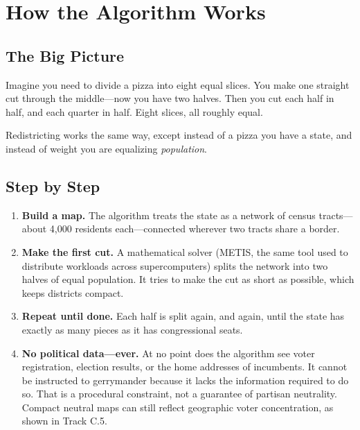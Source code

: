
\section{How the Algorithm Works}

\subsection*{The Big Picture}

Imagine you need to divide a pizza into eight equal slices.
You make one straight cut through the middle---now you have two halves.
Then you cut each half in half, and each quarter in half.
Eight slices, all roughly equal.

Redistricting works the same way, except instead of a pizza you have
a state, and instead of weight you are equalizing \emph{population}.

\subsection*{Step by Step}

\begin{enumerate}
  \item \textbf{Build a map.}
    The algorithm treats the state as a network of census tracts---about
    4,000 residents each---connected wherever two tracts share a border.

  \item \textbf{Make the first cut.}
    A mathematical solver (METIS, the same tool used to distribute
    workloads across supercomputers) splits the network into two halves
    of equal population.  It tries to make the cut as short as possible,
    which keeps districts compact.

  \item \textbf{Repeat until done.}
    Each half is split again, and again, until the state has exactly as
    many pieces as it has congressional seats.

  \item \textbf{No political data---ever.}
    At no point does the algorithm see voter registration, election
    results, or the home addresses of incumbents.  It cannot be instructed
    to gerrymander because it lacks the information required to do so.  That is a
    procedural constraint, not a guarantee of partisan neutrality.
    Compact neutral maps can still reflect geographic voter concentration,
    as shown in Track C.5.
\end{enumerate}

